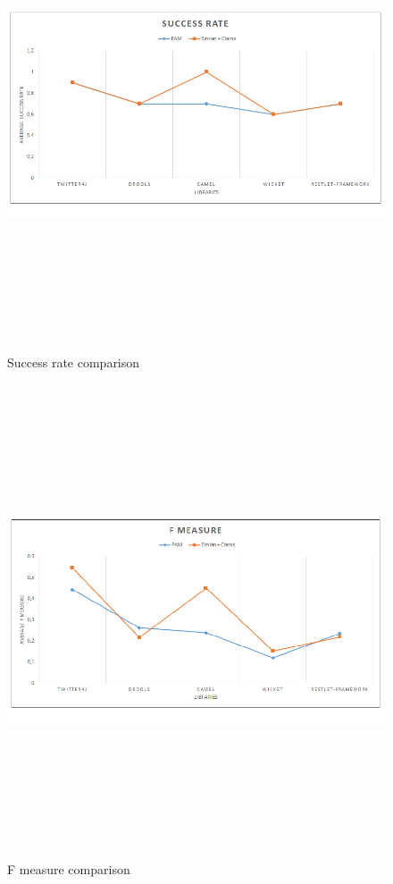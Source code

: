 \begin{figure}[H]
\includegraphics[width=14cm,height=14cm,keepaspectratio]{images/SuccRate.png}
\centering
\caption{Success rate comparison}
\label{fig:cmd}
\end{figure}


\begin{figure}[H]
\includegraphics[width=14cm,height=14cm,keepaspectratio]{images/Fmeasure.png}
\centering
\caption{F measure  comparison}
\label{fig:cmd}
\end{figure}


